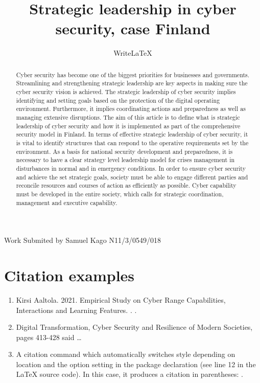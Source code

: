 \documentclass[a4paper]{article}
\title{Strategic leadership in cyber security, case Finland}
\author{WriteLaTeX}
\date{}
\begin{document}
\maketitle
\text Work Submited by Samuel Kago N11/3/0549/018
\begin{abstract}
Cyber security has become one of the biggest priorities for businesses and governments. Streamlining and strengthening strategic leadership are key aspects in making sure the cyber security vision is achieved. The strategic leadership of cyber security implies identifying and setting goals based on the protection of the digital operating environment. Furthermore, it implies coordinating actions and preparedness as well as managing extensive disruptions. The aim of this article is to define what is strategic leadership of cyber security and how it is implemented as part of the comprehensive security model in Finland. In terms of effective strategic leadership of cyber security, it is vital to identify structures that can respond to the operative requirements set by the environment. As a basis for national security development and preparedness, it is necessary to have a clear strategy level leadership model for crises management in disturbances in normal and in emergency conditions. In order to ensure cyber security and achieve the set strategic goals, society must be able to engage different parties and reconcile resources and courses of action as efficiently as possible. Cyber capability must be developed in the entire society, which calls for strategic coordination, management and executive capability.
\end{abstract}

\section*{Citation examples}

\begin{enumerate}
\item 

Kirsi Aaltola. 2021. Empirical Study on Cyber Range Capabilities, Interactions and Learning Features. . \parencite{Smith:2012qr}.
\item Digital Transformation, Cyber Security and Resilience of Modern Societies, pages 413-428 \textcite{Smith:2013jd} said \dots
\item A citation command which automatically switches style depending on location and the option setting in the package declaration (see line 12 in the LaTeX source code). In this case, it produces a citation in parentheses: \autocite{Other:2014ab}.
\end{enumerate}

\printbibliography
\end{document}

